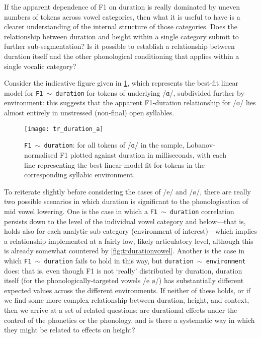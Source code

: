 If the apparent dependence of F1 on duration is really dominated by uneven numbers of tokens across vowel categories, then what it is useful to have is a clearer understanding of the internal structure of those categories. Does the relationship between duration and height within a single category submit to further sub-segmentation? Is it possible to establish a relationship between duration itself and the other phonological conditioning that applies within a single vocalic category?

Consider the indicative figure given in \cref{fig:trdurationa}, which represents the best-fit linear model for \texttt{F1 $\sim$ duration} for tokens of underlying /ɑ/, subdivided further by environment: this suggests that the apparent F1-duration relationship for /ɑ/ lies almost entirely in unstressed (non-final) open syllables.

\begin{figure}[ht]
  \centering
  \texttt{[image: tr\_duration\_a]}
  \caption[\texttt{F1 $\sim$ duration} correlation for /ɑ/, split by environment.]{\texttt{F1 $\sim$ duration}: for all tokens of /ɑ/ in the sample, Lobanov-normalised F1 plotted against duration in milliseconds, with each line representing the best linear-model fit for tokens in the corresponding syllabic environment.}
  \label{fig:trdurationa}
\end{figure}

To reiterate slightly before considering the cases of /e/ and /ø/, there are really two possible scenarios in which duration is significant to the phonologisation of mid vowel lowering. One is the case in which a \texttt{F1 $\sim$ duration} correlation persists down to the level of the individual vowel category and below---that is, holds also for each analytic sub-category (environment of interest)---which implies a relationship implemented at a fairly low, likely articulatory level, although this is already somewhat countered by \cref{fig:trdurationvowel}. Another is the case in which \texttt{F1 $\sim$ duration} fails to hold in this way, but \texttt{duration $\sim$ environment} does: that is, even though F1 is not `really' distributed by duration, duration itself (for the phonologically-targeted vowels /e ø/) has substantially different expected values across the different environments. If neither of these holds, or if we find some more complex relationship between duration, height, and context, then we arrive at a set of related questions; are durational effects under the control of the phonetics or the phonology, and is there a systematic way in which they might be related to effects on height?

